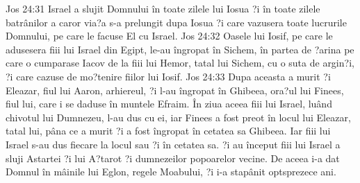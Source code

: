 Jos 24:31  Israel a slujit Domnului în toate zilele lui Iosua ?i în toate zilele batrânilor a caror via?a s-a prelungit dupa Iosua ?i care vazusera toate lucrurile Domnului, pe care le facuse El cu Israel.
Jos 24:32  Oasele lui Iosif, pe care le adusesera fiii lui Israel din Egipt, le-au îngropat în Sichem, în partea de ?arina pe care o cumparase Iacov de la fiii lui Hemor, tatal lui Sichem, cu o suta de argin?i, ?i care cazuse de mo?tenire fiilor lui Iosif.
Jos 24:33  Dupa aceasta a murit ?i Eleazar, fiul lui Aaron, arhiereul, ?i l-au îngropat în Ghibeea, ora?ul lui Finees, fiul lui, care i se daduse în muntele Efraim. În ziua aceea fiii lui Israel, luând chivotul lui Dumnezeu, l-au dus cu ei, iar Finees a fost preot în locul lui Eleazar, tatal lui, pâna ce a murit ?i a fost îngropat în cetatea sa Ghibeea. Iar fiii lui Israel s-au dus fiecare la locul sau ?i în cetatea sa. ?i au început fiii lui Israel a sluji Astartei ?i lui A?tarot ?i dumnezeilor popoarelor vecine. De aceea i-a dat Domnul în mâinile lui Eglon, regele Moabului, ?i i-a stapânit optsprezece ani.


